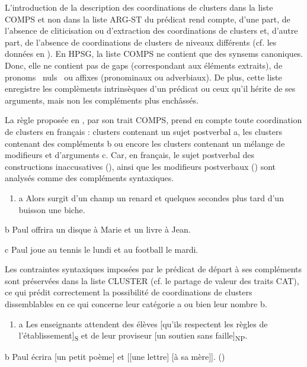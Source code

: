 L'introduction de la description des coordinations de clusters dans la liste COMPS et non dans la liste ARG-ST du prédicat rend compte, d'une part, de l'absence de cliticisation ou d'extraction des coordinations de clusters et, d'autre part, de l'absence de coordinations de clusters de niveaux différents (cf. les données en ). En HPSG, la liste COMPS ne contient que des synsems canoniques. Donc, elle ne contient pas de gaps (correspondant aux éléments extraits), de pronoms {\guillemotleft}~nuls~{\guillemotright} ou affixes (pronominaux ou adverbiaux). De plus, cette liste enregistre les complèments intrinsèques d'un prédicat ou ceux qu'il hérite de ses arguments, mais non les compléments plus enchâssés. 

La règle proposée en , par son trait COMPS, prend en compte toute coordination de clusters en français : clusters contenant un sujet postverbal a, les clusters contenant des compléments b ou encore les clusters contenant un mélange de modifieurs et d'arguments c. Car, en français, le sujet postverbal des constructions inaccusatives (\citet{Marandin1999}), ainsi que les modifieurs postverbaux (\citet{Mouret2007}) sont analysés comme des compléments syntaxiques. 


\begin{enumerate}
\item \label{bkm:Ref300058336}a   Alors surgit d'un champ un renard et quelques secondes plus tard d'un buisson une biche. 


\end{enumerate}
  b  Paul offrira un disque à Marie et un livre à Jean.

  c  Paul joue au tennis le lundi et au football le mardi.

Les contraintes syntaxiques imposées par le prédicat de départ à ses compléments sont préservées dans la liste CLUSTER (cf. le partage de valeur des traits CAT), ce qui prédit correctement la possibilité de coordinations de clusters dissemblables en ce qui concerne leur catégorie a ou bien leur nombre b. 


\begin{enumerate}
\item \label{bkm:Ref300060544}a   Les enseignants attendent des élèves [qu'ils respectent les règles de l'établissement]\textsubscript{S} et de leur proviseur [un soutien sans faille]\textsubscript{NP}. 


\end{enumerate}
  b  Paul écrira [un petit poème] et [[une lettre] [à sa mère]].    (\citet[337]{Mouret2007})

